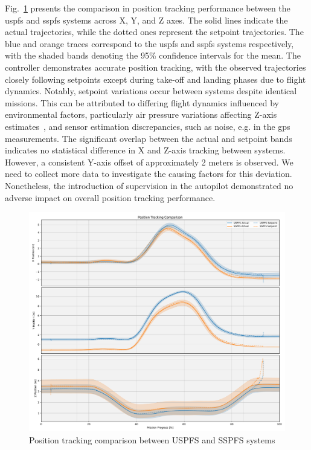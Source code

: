 Fig.~\ref{fig:pos-track-cmp} presents the comparison in position 
tracking performance between the \gls{uspfs} and \gls{sspfs}
systems across X, Y, and Z axes.
%
The solid lines indicate the actual trajectories, while the dotted ones
represent the setpoint trajectories. The blue and orange traces correspond to
the \gls{uspfs} and \gls{sspfs} systems respectively, with the shaded
bands denoting the 95\% confidence intervals for the mean.
%
The controller demonstrates accurate position tracking, with the observed
trajectories closely following setpoints except during take-off and landing
phases due to flight dynamics.
%
Notably, setpoint variations occur between systems despite identical
missions. This can be attributed to differing flight dynamics influenced by
environmental factors, particularly air pressure variations affecting Z-axis
estimates~\cite{px4-static-pressure,px4-static-pressure-correc}, and sensor
estimation discrepancies, such as noise, e.g. in the \gls{gps} measurements.
%
The significant overlap between the actual and setpoint bands indicates no statistical difference in X and Z-axis
tracking between systems. However, a consistent Y-axis offset of approximately 2
meters is observed. We need to collect more data to investigate the causing factors for
this deviation. Nonetheless, the introduction of supervision in the autopilot
demonstrated no adverse impact on overall position tracking performance.

\begin{figure}[!hbt]
  \centering
  \includegraphics[width=1.0\textwidth]{./img/pdf/pos-track-cmp} 
  \caption{Position tracking comparison between USPFS and SSPFS systems}%
  \label{fig:pos-track-cmp}
\end{figure}

